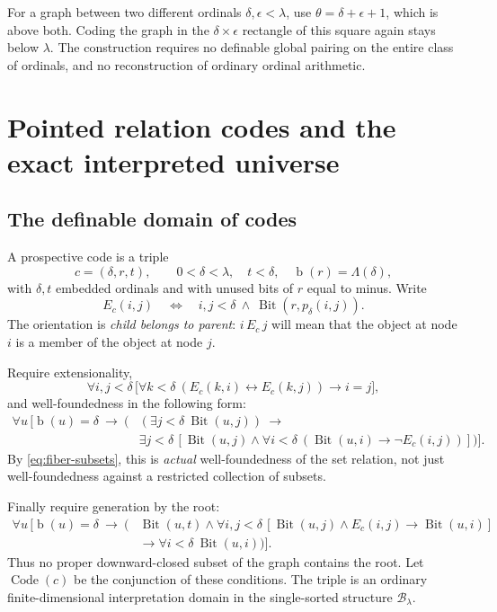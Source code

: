 \documentclass[11pt,letterpaper]{article}
\theoremstyle{definition}
\theoremstyle{remark}
\newcommand{\bd}{\operatorname{b}}
\newcommand{\B}{\mathcal B}
\newcommand{\Code}{\operatorname{Code}}
\newcommand{\Bit}{\operatorname{Bit}}
\begin{document}
For a graph between two different ordinals $\delta,\epsilon<\lambda$, use
$\theta=\delta+\epsilon+1$, which is above both. Coding the graph in the
$\delta\times\epsilon$ rectangle of this square again stays below $\lambda$.
The construction requires no definable global pairing on the entire class
of ordinals, and no reconstruction of ordinary ordinal arithmetic.

\section{Pointed relation codes and the exact interpreted universe}
\label{sec:codes}

\subsection{The definable domain of codes}

A prospective code is a triple
\[
 c=(\delta,r,t),\qquad
 0<\delta<\lambda,\quad t<\delta,\quad\bd(r)=\Lambda(\delta),
\]
with $\delta,t$ embedded ordinals and with unused bits of $r$ equal to minus.
Write
\[
 E_c(i,j)\quad\Longleftrightarrow\quad
 i,j<\delta\ \land\ \Bit(r,p_\delta(i,j)).
\]
The orientation is \emph{child belongs to parent}: $i\,E_c\,j$ will mean
that the object at node $i$ is a member of the object at node $j$.

Require extensionality,
\begin{equation}
 \forall i,j<\delta\,
 \bigl[\forall k<\delta\ (E_c(k,i)\leftrightarrow E_c(k,j))
       \longrightarrow i=j\bigr],
 \label{eq:extensional}
\end{equation}
and well-foundedness in the following form:
\begin{align}
 \forall u\,[\bd(u)=\delta\ \longrightarrow\ (&
 (\exists j<\delta\ \Bit(u,j))\ \longrightarrow\nonumber\\[-0.2em]
 &\exists j<\delta\,[\Bit(u,j)\land
    \forall i<\delta\ (\Bit(u,i)\longrightarrow\neg E_c(i,j))])].
 \label{eq:wf}
\end{align}
By \eqref{eq:fiber-subsets}, this is \emph{actual} well-foundedness of the
set relation, not just well-foundedness against a restricted collection of
subsets.

Finally require generation by the root:
\begin{align}
 \forall u\,[\bd(u)=\delta\ \longrightarrow\ (&
 \Bit(u,t)\land
 \forall i,j<\delta\,[\Bit(u,j)\land E_c(i,j)\longrightarrow\Bit(u,i)]
 \nonumber\\[-0.2em]
 &\longrightarrow\forall i<\delta\ \Bit(u,i))].
 \label{eq:rooted}
\end{align}
Thus no proper downward-closed subset of the graph contains the root.
Let $\Code(c)$ be the conjunction of these conditions. The triple is an
ordinary finite-dimensional interpretation domain in the single-sorted
structure $\B_\lambda$.
\end{document}

